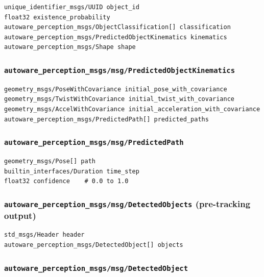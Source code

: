 \documentclass[
]{article}
\begin{document}
\begin{verbatim}
unique_identifier_msgs/UUID object_id
float32 existence_probability
autoware_perception_msgs/ObjectClassification[] classification
autoware_perception_msgs/PredictedObjectKinematics kinematics
autoware_perception_msgs/Shape shape
\end{verbatim}

\subsubsection{\texorpdfstring{\texttt{autoware\_perception\_msgs/msg/PredictedObjectKinematics}}{autoware\_perception\_msgs/msg/PredictedObjectKinematics}}\label{autoware_perception_msgsmsgpredictedobjectkinematics}

\begin{verbatim}
geometry_msgs/PoseWithCovariance initial_pose_with_covariance
geometry_msgs/TwistWithCovariance initial_twist_with_covariance
geometry_msgs/AccelWithCovariance initial_acceleration_with_covariance
autoware_perception_msgs/PredictedPath[] predicted_paths
\end{verbatim}

\subsubsection{\texorpdfstring{\texttt{autoware\_perception\_msgs/msg/PredictedPath}}{autoware\_perception\_msgs/msg/PredictedPath}}\label{autoware_perception_msgsmsgpredictedpath}

\begin{verbatim}
geometry_msgs/Pose[] path
builtin_interfaces/Duration time_step
float32 confidence    # 0.0 to 1.0
\end{verbatim}

\subsubsection{\texorpdfstring{\texttt{autoware\_perception\_msgs/msg/DetectedObjects}
(pre-tracking
output)}{autoware\_perception\_msgs/msg/DetectedObjects (pre-tracking output)}}\label{autoware_perception_msgsmsgdetectedobjects-pre-tracking-output}

\begin{verbatim}
std_msgs/Header header
autoware_perception_msgs/DetectedObject[] objects
\end{verbatim}

\subsubsection{\texorpdfstring{\texttt{autoware\_perception\_msgs/msg/DetectedObject}}{autoware\_perception\_msgs/msg/DetectedObject}}\label{autoware_perception_msgsmsgdetectedobject}
\end{document}

